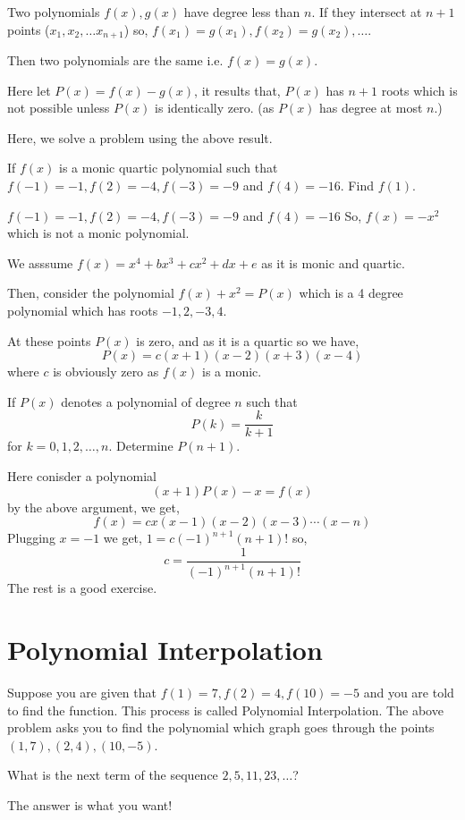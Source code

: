 \begin{theorem}
Two polynomials $f(x), g(x)$ have degree less than $n$. If they intersect at $n+1$ points ($x_1, x_2, \ldots x_{n+1}$) so, $f(x_1)=g(x_1), f(x_2)=g(x_2), \ldots $.

Then two polynomials are the same i.e. $f(x)=g(x)$.
\end{theorem}
Here let $P(x)=f(x)-g(x)$, it results that, $P(x)$ has $n+1$ roots which is not possible unless $P(x)$ is identically zero. (as $P(x)$ has degree at most $n$.)

Here, we solve a problem using the above result.
\begin{example}
If $f(x)$ is a monic quartic polynomial such that $f(-1)=-1, f(2)=-4, f(-3)=-9$ and $f(4)=-16$. Find $f(1)$.
\end{example}

$f(-1)=-1, f(2)=-4, f(-3)=-9$ and $f(4)=-16$
So, $f(x)=-x^2$ which is not a monic polynomial.

We asssume $f(x)=x^4 + bx^3 + cx^2 +dx +e$ as it is monic and quartic.

Then, consider the polynomial $f(x)+x^2=P(x)$ which is a 4 degree polynomial which has roots $-1, 2, -3, 4$.

At these points $P(x)$ is zero, and as it is a quartic so we have, \[P(x)=c(x+1)(x-2)(x+3)(x-4)\]
where $c$ is obviously zero as $f(x)$ is a monic.

\begin{example}
If $P(x)$ denotes a polynomial of degree $n$ such that \[P(k)=\frac{k}{k+1}\]
for $k=0,1,2,\ldots, n$. Determine $P(n+1).$
\end{example}
Here conisder a polynomial \[(x+1)P(x)-x=f(x)\]
by the above argument, we get, \[f(x)=cx(x-1)(x-2)(x-3)\cdots (x-n)\]
Plugging $x=-1$ we get, $1=c(-1)^{n+1}(n+1)!$
so, \[c=\frac{1}{(-1)^{n+1}(n+1)!}\]
The rest is a good exercise.

\section{Polynomial Interpolation}%
Suppose you are given that $f(1)=7, f(2)=4, f(10)=-5$ and you are told to find the function. This process is called Polynomial Interpolation. The above problem asks you to find the polynomial which graph goes through the points $(1,7), (2,4), (10,-5)$.

\begin{example}
What is the next term of the sequence $2,5,11,23,\ldots $?
\end{example}
The answer is what you want!

